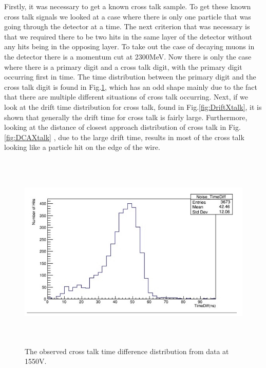\documentclass[./Thesis]{subfiles}
\begin{document}
	Firstly, it was necessary to get a known cross talk sample.  To get these known cross talk signals we looked at a case where there is only one particle that was going through the detector at a time.  The next criterion that was necessary is that we required there to be two hits in the same layer of the detector without any hits being in the opposing layer.  To take out the case of decaying muons in the detector there is a momentum cut at 2300MeV.  Now there is only the case where there is a primary digit and a cross talk digit, with the primary digit occurring first in time.  The time distribution between the primary digit and the cross talk digit is found in Fig.\ref{fig:TimeXtalk}, which has an odd shape mainly due to the fact that there are multiple different situations of cross talk occurring. Next, if we look at the drift time distribution for cross talk, found in Fig.\ref{fig:DriftXtalk}, it is shown that generally the drift time for cross talk is fairly large. Furthermore, looking at the distance of closest approach distribution of cross talk in Fig.\ref{fig:DCAXtalk} , due to the large drift time, results in most of the cross talk looking like a particle hit on the edge of the wire.
		
\begin{figure}
	\centerline{\includegraphics[height=95mm]{TimeDiffXtalk.jpeg}}
	\caption[ Cross Talk Time Distribution]{ The observed cross talk time difference distribution from data at 1550V.}
	\label{fig:TimeXtalk}
\end{figure}
\end{document}
